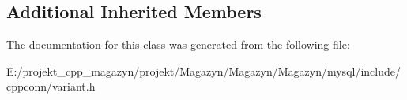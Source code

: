 \subsection*{Additional Inherited Members}


The documentation for this class was generated from the following file\+:\begin{DoxyCompactItemize}
\item 
E\+:/projekt\+\_\+cpp\+\_\+magazyn/projekt/\+Magazyn/\+Magazyn/\+Magazyn/mysql/include/cppconn/variant.\+h\end{DoxyCompactItemize}
